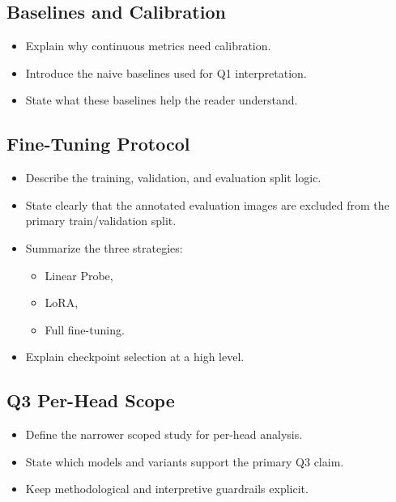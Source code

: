 \documentclass[11pt]{article}
\begin{document}
\subsection{Baselines and Calibration}

\begin{itemize}[leftmargin=1.5em]
    \item Explain why continuous metrics need calibration.
    \item Introduce the naive baselines used for Q1 interpretation.
    \item State what these baselines help the reader understand.
\end{itemize}

\subsection{Fine-Tuning Protocol}

\begin{itemize}[leftmargin=1.5em]
    \item Describe the training, validation, and evaluation split logic.
    \item State clearly that the annotated evaluation images are excluded from
    the primary train/validation split.
    \item Summarize the three strategies:
    \begin{itemize}[leftmargin=1.5em]
        \item Linear Probe,
        \item LoRA,
        \item Full fine-tuning.
    \end{itemize}
    \item Explain checkpoint selection at a high level.
\end{itemize}

\subsection{Q3 Per-Head Scope}

\begin{itemize}[leftmargin=1.5em]
    \item Define the narrower scoped study for per-head analysis.
    \item State which models and variants support the primary Q3 claim.
    \item Keep methodological and interpretive guardrails explicit.
\end{itemize}
\end{document}
